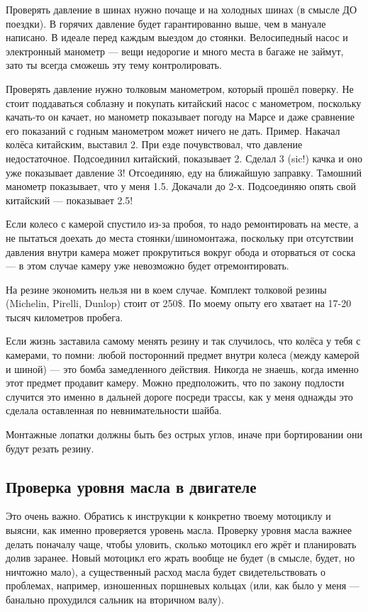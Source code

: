 \documentclass[12pt,a4paper]{article}
\begin{document}
Проверять давление в шинах нужно почаще и на холодных шинах
(в смысле ДО поездки). В горячих давление будет гарантированно выше, чем в
мануале написано. В идеале перед каждым выездом до стоянки. Велосипедный
насос и электронный манометр --- вещи недорогие и много места в багаже не
займут, зато ты всегда сможешь эту тему контролировать.

Проверять давление нужно толковым манометром, который прошёл поверку. Не стоит
поддаваться соблазну и покупать китайский насос с манометром, поскольку
качать-то он качает, но манометр показывает погоду на Марсе и даже сравнение
его показаний с годным манометром может ничего не дать. Пример. Накачал колёса
китайским, выставил 2. При езде почувствовал, что давление недостаточное.
Подсоединил китайский, показывает 2. Сделал 3 (sic!) качка и оно уже показывает
давление 3! Отсоединяю, еду на ближайшую заправку. Тамошний манометр показывает,
что у меня 1.5. Докачали до 2-х. Подсоединяю опять свой китайский ---
показывает 2.5!

Если колесо с камерой спустило из-за пробоя, то надо ремонтировать на месте,
а не пытаться доехать до места стоянки/шиномонтажа, поскольку при отсутствии
давления внутри камера может прокрутиться вокруг обода и оторваться от соска ---
в этом случае камеру уже невозможно будет отремонтировать.

На резине экономить нельзя ни в коем случае. Комплект толковой резины
(Michelin, Pirelli, Dunlop) стоит от 250\$. По моему опыту его хватает
на 17-20 тысяч километров пробега.

Если жизнь заставила самому менять резину и так случилось, что колёса у тебя
с камерами, то помни: любой посторонний предмет внутри колеса (между камерой
и шиной) --- это бомба замедленного действия. Никогда не знаешь, когда именно
этот предмет продавит камеру. Можно предположить, что по закону
подлости случится это именно в дальней дороге посреди трассы, как
у меня однажды это сделала оставленная по невнимательности шайба.

Монтажные лопатки должны быть без острых углов, иначе при бортировании
они будут резать резину.

\subsection{Проверка уровня масла в двигателе}

Это очень важно. Обратись к инструкции к конкретно твоему мотоциклу и
выясни, как именно проверяется уровень масла. Проверку уровня масла важнее
делать поначалу чаще, чтобы уловить, сколько мотоцикл его жрёт и планировать
долив заранее. Новый мотоцикл его жрать вообще не будет (в смысле, будет,
но ничтожно мало), а существенный расход масла будет свидетельствовать о
проблемах, например, изношенных поршневых кольцах (или, как было у меня ---
банально прохудился сальник на вторичном валу).
\end{document}
